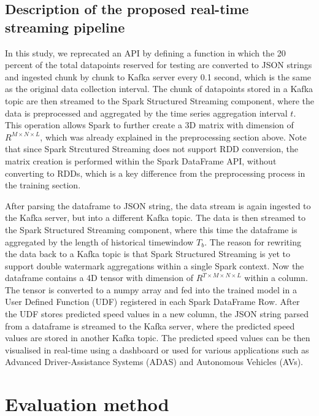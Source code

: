 \documentclass[11pt]{uonthesis}
\begin{document}
\subsection{Description of the proposed real-time streaming pipeline}

In this study, we reprecated an API by defining a function in which the 20 percent of the total datapoints reserved for testing are converted to JSON strings and ingested chunk by chunk to Kafka server every 0.1 second, which is the same as the original data collection interval. The chunk of datapoints stored in a Kafka topic are then streamed to the Spark Structured Streaming component, where the data is preprocessed and aggregated by the time series aggregation interval $t$. This operation allows Spark to further create a 3D matrix with dimension of $R^{M{\times}N{\times}L}$, which was already explained in the preprocessing section above. Note that since Spark Strcutured Streaming does not support RDD conversion, the matrix creation is performed within the Spark DataFrame API, without converting to RDDs, which is a key difference from the preprocessing process in the training section. 

After parsing the dataframe to JSON string, the data stream is again ingested to the Kafka server, but into a different Kafka topic. The data is then streamed to the Spark Structured Streaming component, where this time the dataframe is aggregated by the length of historical timewindow $T_b$. The reason for rewriting the data back to a Kafka topic is that Spark Structured Streaming is yet to support double watermark aggregations within a single Spark context. Now the dataframe contains a 4D tensor with dimension of $R^{T{\times}M{\times}N{\times}L}$ within a column. The tensor is converted to a numpy array and fed into the trained model in a User Defined Function (UDF) registered in each Spark DataFrame Row. After the UDF stores predicted speed values in a new column, the JSON string parsed from a dataframe is streamed to the Kafka server, where the predicted speed values are stored in another Kafka topic. The predicted speed values can be then visualised in real-time using a dashboard or used for various applications such as Advanced Driver-Assistance Systems (ADAS) and Autonomous Vehicles (AVs). 

\section{Evaluation method}
\end{document}
